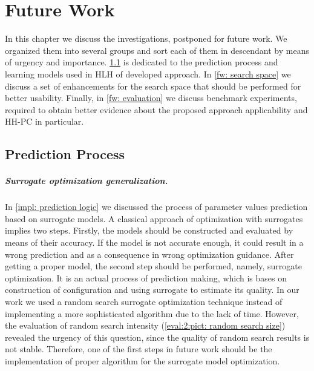 \chapter{Future Work}\label{future work}
In this chapter we discuss the investigations, postponed for future work. We organized them into several groups and sort each of them in descendant by means of urgency and importance. \cref{fw: prediction process} is dedicated to the prediction process and learning models used in HLH of developed approach. In \cref{fw: search space} we discuss a set of enhancements for the search space that should be performed for better usability. Finally, in \cref{fw: evaluation} we discuss benchmark experiments, required to obtain better evidence about the proposed approach applicability and HH-PC in particular.


\section{Prediction Process}\label{fw: prediction process}
\paragraph{Surrogate optimization generalization.} In \cref{impl: prediction logic} we discussed the process of parameter values prediction based on surrogate models. A classical approach of optimization with surrogates implies two steps. Firstly, the models should be constructed and evaluated by means of their accuracy. If the model is not accurate enough, it could result in a wrong prediction and as a consequence in wrong optimization guidance. After getting a proper model, the second step should be performed, namely, surrogate optimization. It is an actual process of prediction making, which is bases on construction of configuration and using surrogate to estimate its quality. In our work we used a random search surrogate optimization technique instead of implementing a more sophisticated algorithm due to the lack of time. However, the evaluation of random search intensity (\cref{eval:2:pict: random search size}) revealed the urgency of this question, since the quality of random search results is not stable. Therefore, one of the first steps in future work should be the implementation of proper algorithm for the surrogate model optimization.


